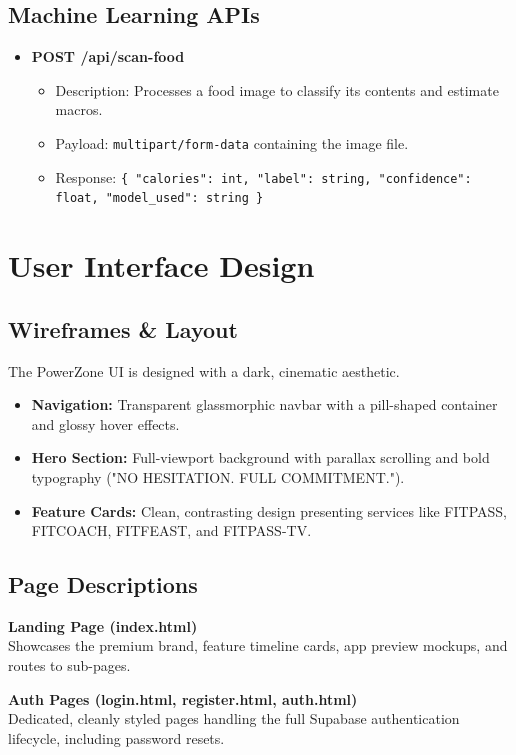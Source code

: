 \documentclass[12pt,a4paper]{article}
\begin{document}
\subsection{Machine Learning APIs}
\begin{itemize}
    \item \textbf{POST /api/scan-food}
    \begin{itemize}
        \item Description: Processes a food image to classify its contents and estimate macros.
        \item Payload: \texttt{multipart/form-data} containing the image file.
        \item Response: \texttt{\{ "calories": int, "label": string, "confidence": float, "model\_used": string \}}
    \end{itemize}
\end{itemize}

\section{User Interface Design}

\subsection{Wireframes \& Layout}
The PowerZone UI is designed with a dark, cinematic aesthetic.
\begin{itemize}
    \item \textbf{Navigation:} Transparent glassmorphic navbar with a pill-shaped container and glossy hover effects.
    \item \textbf{Hero Section:} Full-viewport background with parallax scrolling and bold typography ("NO HESITATION. FULL COMMITMENT.").
    \item \textbf{Feature Cards:} Clean, contrasting design presenting services like FITPASS, FITCOACH, FITFEAST, and FITPASS-TV.
\end{itemize}

\subsection{Page Descriptions}
\textbf{Landing Page (index.html)}\\
Showcases the premium brand, feature timeline cards, app preview mockups, and routes to sub-pages.

\textbf{Auth Pages (login.html, register.html, auth.html)}\\
Dedicated, cleanly styled pages handling the full Supabase authentication lifecycle, including password resets.
\end{document}
